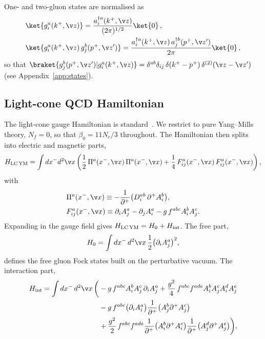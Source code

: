 One- and two-gluon states are normalised as
\begin{align}\label{eq:states}
&\ket{g^a_i(k^+,\v z)}=\frac{a^{\dagger a}_i(k^+,\v z)}{(2\pi)^{1/2}}\ket{0}\,,\notag\\
&\ket{g^a_i(k^+,\v z)\,g^b_j(p^+,\v z')}=\frac{a^{\dagger a}_i(k^+,\v z)\,a^{\dagger b}_j(p^+,\v z')}{2\pi}\ket{0}\,,
\end{align}
so that $\braket{g^b_j(p^+,\v z')|g^a_i(k^+,\v z)}=\delta^{ab}\delta_{ij}\,\delta(k^+-p^+)\,\delta^{(2)}(\v z-\v z')$
(see Appendix~\ref{app:states}).

\subsection{Light-cone QCD Hamiltonian}\label{subsec:LCQCD}
The light-cone gauge Hamiltonian is standard~\cite{Lublinsky:2016meo,Kovner:2005pe,Kovner:2005jc}.
We restrict to pure Yang--Mills theory, $N_f=0$, so that $\beta_0=11N_c/3$ throughout. The
Hamiltonian then splits into electric and magnetic parts,
\begin{align}\label{eq:LCQCD}
H_{\rm LC\,YM}=\int dx^{-}d^{2}\v x\left(\frac{1}{2}\,\Pi^{a}(x^{-},\v x)\,\Pi^{a}(x^{-},\v x)
+\frac{1}{4}\,F_{ij}^{a}(x^{-},\v x)\,F_{ij}^{a}(x^{-},\v x)\right),
\end{align}
with
\begin{equation}\begin{split}
&\Pi^{a}(x^{-},\v x)\equiv-\frac{1}{\partial^{+}}\big(D_{i}^{ab}\,\partial^{+}A_{i}^{b}\big),\\
&F_{ij}^{a}(x^{-},\v x)\equiv\partial_{i}A_{j}^{a}-\partial_{j}A_{i}^{a}-g\,f^{abc}A_{i}^{b}A_{j}^{c}.
\end{split}\end{equation}
Expanding in the gauge field gives $H_{\rm LC\,YM}=H_{0}+H_{\rm int}$. The free part,
\begin{align}\label{eq:free}
H_{0}=\int dx^{-}\,d^{2}\v x\,\frac{1}{2}\big(\partial_{i}A_{j}^{a}\big)^{2},
\end{align}
defines the free gluon Fock states built on the perturbative vacuum. The interaction part,
\begin{align}\label{eq:Hint}
H_{\rm int}=\int dx^{-}\,d^{2}\v x\,\bigg(&-g\,f^{abc}A_{i}^{b}A_{j}^{c}\,\partial_{i}A_{j}^{a}
+\frac{g^{2}}{4}\,f^{abc}f^{ade}A_{i}^{b}A_{j}^{c}A_{i}^{d}A_{j}^{e}\notag\\
&-g\,f^{abc}\big(\partial_{i}A_{i}^{a}\big)\frac{1}{\partial^{+}}\big(A_{j}^{b}\partial^{+}A_{j}^{c}\big)\notag\\
&+\frac{g^{2}}{2}\,f^{abc}f^{ade}\frac{1}{\partial^{+}}\big(A_{i}^{b}\partial^{+}A_{i}^{c}\big)\frac{1}{\partial^{+}}\big(A_{j}^{d}\partial^{+}A_{j}^{e}\big)\bigg),
\end{align}
